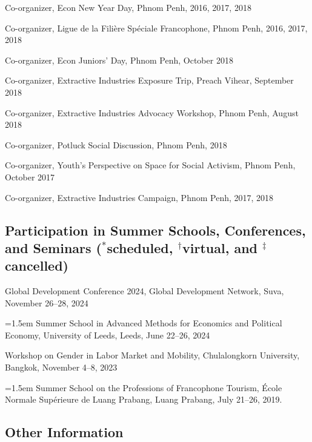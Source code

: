 \documentclass[10pt,a4paper]{article}
\begin{document}
	Co-organizer, Econ New Year Day, Phnom Penh, 2016, 2017, 2018

	Co-organizer, Ligue de la Filière Spéciale Francophone, Phnom Penh, 2016, 2017, 2018
		
	Co-organizer, Econ Juniors' Day, Phnom Penh, October 2018
		
	Co-organizer, Extractive Industries Exposure Trip, Preach Vihear, September 2018

	Co-organizer, Extractive Industries Advocacy Workshop, Phnom Penh, August 2018
		
	Co-organizer, Potluck Social Discussion, Phnom Penh, 2018
			
	Co-organizer, Youth's Perspective on Space for Social Activism, Phnom Penh, October 2017
		
	Co-organizer, Extractive Industries Campaign, Phnom Penh, 2017, 2018


\subsection*{Participation in Summer Schools, Conferences, and Seminars ($^\ast$scheduled, $^\dag$virtual, and $^\ddag$cancelled)}

Global Development Conference 2024, Global Development Network, Suva, November 26--28, 2024 

\hangindent=1.5em
Summer School in Advanced Methods for Economics and Political Economy, University of Leeds, Leeds, June 22--26, 2024

Workshop on Gender in Labor Market and Mobility, Chulalongkorn University, Bangkok, November 4--8, 2023

\hangindent=1.5em
Summer School on the Professions of Francophone Tourism, École Normale Supérieure de Luang Prabang, Luang Prabang, July 21–26, 2019.



\subsection*{Other Information}
\end{document}
